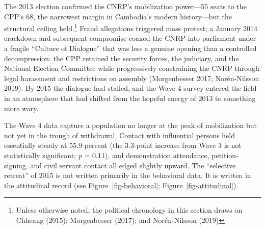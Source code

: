 \documentclass[
  12pt,
  letterpaper]{article}
\begin{document}
The 2013 election confirmed the CNRP's mobilization power---55 seats to
the CPP's 68, the narrowest margin in Cambodia's modern history---but
the structural ceiling held.\footnote{Unless otherwise noted, the
  political chronology in this section draws on Chheang (2015);
  Morgenbesser (2017); and Norén-Nilsson (2019)} Fraud allegations
triggered mass protest; a January 2014 crackdown and subsequent
compromise coaxed the CNRP into parliament under a fragile ``Culture of
Dialogue'' that was less a genuine opening than a controlled
decompression: the CPP retained the security forces, the judiciary, and
the National Election Committee while progressively constraining the
CNRP through legal harassment and restrictions on assembly (Morgenbesser
2017; Norén-Nilsson 2019). By 2015 the dialogue had stalled, and the
Wave 4 survey entered the field in an atmosphere that had shifted from
the hopeful energy of 2013 to something more wary.

The Wave 4 data capture a population no longer at the peak of
mobilization but not yet in the trough of withdrawal. Contact with
influential persons held essentially steady at 55.9 percent (the
3.3-point increase from Wave 3 is not statistically significant;
\emph{p} = 0.11), and demonstration attendance, petition-signing, and
civil servant contact all edged slightly upward. The ``selective
retreat'' of 2015 is not written primarily in the behavioral data. It is
written in the attitudinal record (see Figure~\ref{fig-behavioral};
Figure~\ref{fig-attitudinal}).
\end{document}
